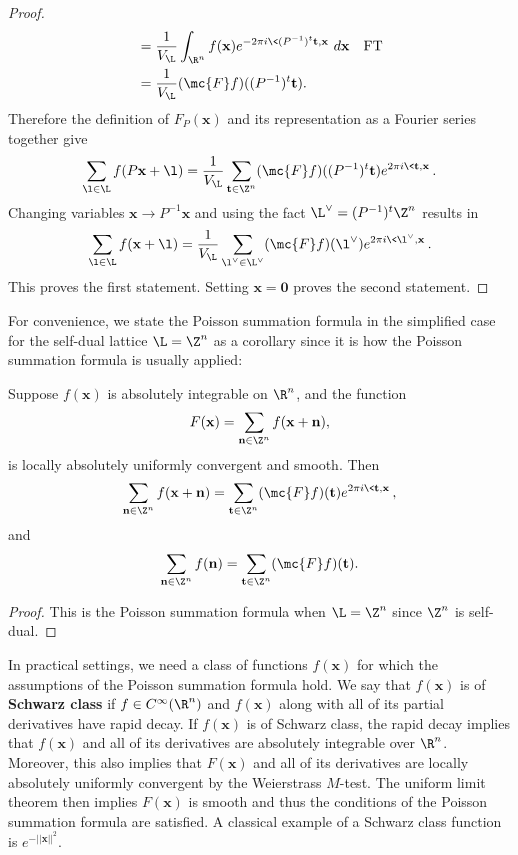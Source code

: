 \begin{proof}
\begin{align*}
        &= \frac{1}{V_{\L}}\int_{\R^{n}}f(\mathbf{x})e^{-2\pi i\<(P^{-1})^{t}\mathbf{t},\mathbf{x}\>}\,d\mathbf{x} && \text{FT} \\
        &= \frac{1}{V_{\L}}(\mc{F}f)((P^{-1})^{t}\mathbf{t}).
      \end{align*}
      Therefore the definition of $F_{P}(\mathbf{x})$ and its representation as a Fourier series together give
      \[
        \sum_{\l \in \L}f(P\mathbf{x}+\l) = \frac{1}{V_{\L}}\sum_{\mathbf{t} \in \Z^{n}}(\mc{F}f)((P^{-1})^{t}\mathbf{t})e^{2\pi i\<\mathbf{t},\mathbf{x}\>}.
      \]
      Changing variables $\mathbf{x} \to P^{-1}\mathbf{x}$ and using the fact $\L^{\vee} = (P^{-1})^{t}\Z^{n}$ results in
      \[
        \sum_{\l \in \L}f(\mathbf{x}+\l) = \frac{1}{V_{\L}}\sum_{\l^{\vee} \in \L^{\vee}}(\mc{F}f)(\l^{\vee})e^{2\pi i\<\l^{\vee},\mathbf{x}\>}.
      \]
      This proves the first statement. Setting $\mathbf{x} = \mathbf{0}$ proves the second statement.
    \end{proof}

    For convenience, we state the Poisson summation formula in the simplified case for the self-dual lattice $\L = \Z^{n}$ as a corollary since it is how the Poisson summation formula is usually applied:

    \begin{corollary}
      Suppose $f(\mathbf{x})$ is absolutely integrable on $\R^{n}$, and the function
      \[
        F(\mathbf{x}) = \sum_{\mathbf{n} \in \Z^{n}}f(\mathbf{x}+\mathbf{n}),
      \]
      is locally absolutely uniformly convergent and smooth. Then
      \[
        \sum_{\mathbf{n} \in \Z^{n}}f(\mathbf{x}+\mathbf{n}) = \sum_{\mathbf{t} \in \Z^{n}}(\mc{F}f)(\mathbf{t})e^{2\pi i\<\mathbf{t},\mathbf{x}\>},
      \]
      and
      \[
        \sum_{\mathbf{n} \in \Z^{n}}f(\mathbf{n}) = \sum_{\mathbf{t} \in \Z^{n}}(\mc{F}f)(\mathbf{t}).
      \]
    \end{corollary}
    \begin{proof}
      This is the Poisson summation formula when $\L = \Z^{n}$ since $\Z^{n}$ is self-dual.
    \end{proof}

    In practical settings, we need a class of functions $f(\mathbf{x})$ for which the assumptions of the Poisson summation formula hold. We say that $f(\mathbf{x})$ is of \textbf{Schwarz class} if $f \in C^{\infty}(\R^{n})$ and $f(\mathbf{x})$ along with all of its partial derivatives have rapid decay. If $f(\mathbf{x})$ is of Schwarz class, the rapid decay implies that $f(\mathbf{x})$ and all of its derivatives are absolutely integrable over $\R^{n}$. Moreover, this also implies that $F(\mathbf{x})$ and all of its derivatives are locally absolutely uniformly convergent by the Weierstrass $M$-test. The uniform limit theorem then implies $F(\mathbf{x})$ is smooth and thus the conditions of the Poisson summation formula are satisfied. A classical example of a Schwarz class function is $e^{-||\mathbf{x}||^{2}}$.
